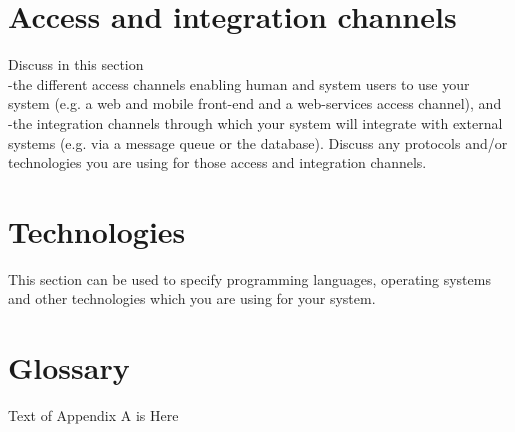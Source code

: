 \documentclass[11pt,titlepage]{article} %
\begin{document}
\section{Access and integration channels}
Discuss in this section
\\-the different access channels enabling human and system users to use your system (e.g. a web
and mobile front-end and a web-services access channel), and
\\-the integration channels through which your system will integrate with external systems (e.g.
via a message queue or the database).
Discuss any protocols and/or technologies you are using for those access and integration channels.

\section{Technologies}
This section can be used to specify programming languages, operating systems and other technologies which you are using for your system.

\newpage
\appendix
\section{Glossary} \label{App:AppendixA}

Text of Appendix A is Here


\newpage
\begin{thebibliography}{10}


\end{thebibliography}
\end{document}
